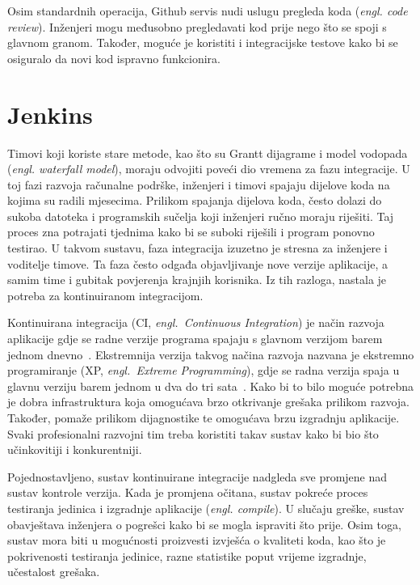 Osim standardnih operacija, Github servis nudi uslugu pregleda koda (\textit{engl. code review}).
Inženjeri mogu međusobno pregledavati kod prije nego što se spoji s glavnom granom. Također, moguće
je koristiti i integracijske testove kako bi se osiguralo da novi kod ispravno funkcionira.

\section{Jenkins}
Timovi koji koriste stare metode, kao što su Grantt dijagrame i model vodopada (\textit{engl.
waterfall model}), moraju odvojiti poveći dio vremena za fazu integracije. U toj fazi razvoja
računalne podrške, inženjeri i timovi spajaju dijelove koda na kojima su radili mjesecima.  Prilikom
spajanja dijelova koda, često dolazi do sukoba datoteka i programskih sučelja koji inženjeri ručno
moraju riješiti. Taj proces zna potrajati tjednima kako bi se suboki riješili i program ponovno
testirao. U takvom sustavu, faza integracija izuzetno je stresna za inženjere i voditelje timove. Ta
faza često odgađa objavljivanje nove verzije aplikacije, a samim time i gubitak povjerenja krajnjih
korisnika. Iz tih razloga, nastala je potreba za kontinuiranom integracijom.

Kontinuirana integracija (CI, \textit{engl.~Continuous Integration}) je način razvoja aplikacije
gdje se radne verzije programa spajaju s glavnom verzijom barem jednom
dnevno~\citep{fowler2006continuous}.  Ekstremnija verzija takvog načina razvoja nazvana je ekstremno
programiranje (XP, \textit{engl.~Extreme Programming}), gdje se radna verzija spaja u glavnu verziju
barem jednom u dva do tri sata~\citep{beck1999embracing}. Kako bi to bilo moguće potrebna je dobra
infrastruktura koja omogućava brzo otkrivanje grešaka prilikom razvoja. Također, pomaže prilikom
dijagnostike te omogućava brzu izgradnju aplikacije. Svaki profesionalni razvojni tim treba
koristiti takav sustav kako bi bio što učinkovitiji i konkurentniji.

Pojednostavljeno, sustav kontinuirane integracije nadgleda sve promjene nad sustav kontrole verzija.
Kada je promjena očitana, sustav pokreće proces testiranja jedinica i izgradnje aplikacije
(\textit{engl. compile}). U slučaju greške, sustav obavještava inženjera o pogrešci kako bi se mogla
ispraviti što prije. Osim toga, sustav mora biti u mogućnosti proizvesti izvješća o kvaliteti koda,
kao što je pokrivenosti testiranja jedinice, razne statistike poput vrijeme izgradnje, učestalost
grešaka.

